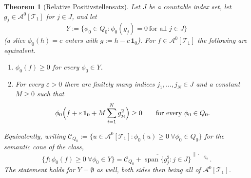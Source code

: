 \documentclass[11pt]{article}
\newtheorem{theorem}{Theorem}
\theoremstyle{definition}
\newcommand{\A}{\mathcal{A}}
\newcommand{\T}{\mathcal{T}}
\newcommand{\C}{\mathcal{C}}
\newcommand{\eps}{\varepsilon}
\newcommand{\one}{\mathbf 1}
\begin{document}
\begin{theorem}[Relative Positivstellensatz]\label{thm:relative-positivstellensatz}
Let $J$ be a countable index set, let $g_j\in\A^0[\T_1]$ for $j\in J$, and let
\[
  Y:=\{\phi_0\in Q_0:\phi_0(g_j)=0\ \text{for all }j\in J\}
\]
(a slice $\phi_0(h)=c$ enters with $g:=h-c\,\one_0$).  For $f\in\A^0[\T_1]$ the
following are equivalent.
\begin{enumerate}[label=\textup{(\alph*)}, leftmargin=2.8em]
  \item\label{psatz-semantic} $\phi_0(f)\ge0$ for every $\phi_0\in Y$.
  \item\label{psatz-penalty} For every $\eps>0$ there are finitely many indices
  $j_1,\dots,j_N\in J$ and a constant $M\ge0$ such that
  \[
    \phi_0\Bigl(f+\eps\,\one_0+M\sum_{i=1}^{N}g_{j_i}^2\Bigr)\ge0
    \qquad\text{for every }\phi_0\in Q_0 .
  \]
\end{enumerate}
Equivalently, writing $\C_{Q_0}:=\{u\in\A^0[\T_1]:\phi_0(u)\ge0\ \forall\phi_0\in Q_0\}$
for the semantic cone of the class,
\[
  \{f:\phi_0(f)\ge0\ \forall\phi_0\in Y\}
  =
  \overline{\C_{Q_0}+\operatorname{span}\{g_j^2:j\in J\}}^{\,\|\cdot\|_{Q_0}} .
\]
The statement holds for $Y=\emptyset$ as well, both sides then being all of
$\A^0[\T_1]$.
\end{theorem}
\end{document}
